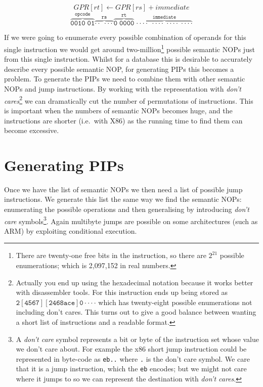 \documentclass[12pt,]{book}
\begin{document}
\[GPR[rt] \gets GPR[rs] + immediate\]
\[\mathtt{\overbrace{0010\;01}^\text{opcode}
\overbrace{\cdot\cdot\;\cdot\cdot\cdot}^\text{rs}
\overbrace{0\;0000}^\text{rt}\; \overbrace{\cdot\cdot\cdot\cdot\;
\cdot\cdot\cdot\cdot\; \cdot\cdot\cdot\cdot\;
\cdot\cdot\cdot\cdot}^\text{immediate}}\]

If we were going to enumerate every possible combination of operands for
this single instruction we would get around two-million\footnote{There
  are twenty-one free bits in the instruction, so there are $2^{21}$
  possible enumerations; which is 2,097,152 in real numbers.} possible
semantic NOPs just from this single instruction. Whilst for a database
this is desirable to accurately describe every possible semantic NOP,
for generating PIPs this becomes a problem. To generate the PIPs we need
to combine them with other semantic NOPs and jump instructions. By
working with the representation with \emph{don't cares}\footnote{Actually
  you end up using the hexadecimal notation because it works better with
  disassembler tools. For this instruction ends up being stored as
  $\mathtt{2[4567][2468ace]0\cdot\cdot\cdot\cdot}$ which has
  twenty-eight possible enumerations not including don't cares. This
  turns out to give a good balance between wanting a short list of
  instructions and a readable format.} we can dramatically cut the
number of permutations of instructions. This is important when the
numbers of semantic NOPs becomes huge, and the instructions are shorter
(i.e.~with X86) as the running time to find them can become excessive.

\section{Generating PIPs}

Once we have the list of semantic NOPs we then need a list of possible
jump instructions. We generate this list the same way we find the
semantic NOPs: enumerating the possible operations and then generalising
by introducing \emph{don't care} symbols\footnote{A \emph{don't care}
  symbol represents a bit or byte of the instruction set whose value we
  don't care about. For example the x86 short jump instruction could be
  represented in byte-code as \lstinline!eb..! where \lstinline!.! is
  the don't care symbol. We care that it is a jump instruction, which
  the \lstinline!eb! encodes; but we might not care where it jumps to so
  we can represent the destination with \emph{don't cares}.}. Again
multibyte jumps are possible on some architectures (such as ARM) by
exploiting conditional execution.
\end{document}
